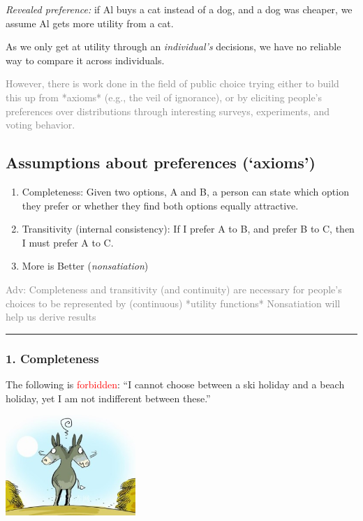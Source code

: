\documentclass[]{article}
\begin{document}
\emph{Revealed preference:} if Al buys a cat instead of a dog, and a dog was cheaper, we assume Al gets more utility from a cat.

As we only get at utility through an \emph{individual's} decisions, we have no reliable way to compare it across individuals.

\textcolor{gray}{However, there is work done in the field of public choice trying either to build this up from *axioms* (e.g., the veil of ignorance),
or by eliciting people's preferences over distributions through interesting surveys, experiments, and voting behavior.}

\hypertarget{assumptions-about-preferences-axioms}{%
\subsection{Assumptions about preferences (`axioms')}\label{assumptions-about-preferences-axioms}}

\begin{enumerate}
\def\labelenumi{\arabic{enumi}.}
\item
  Completeness: Given two options, A and B, a person can state which option they prefer or whether they find both options equally attractive.
\item
  Transitivity (internal consistency): If I prefer A to B, and prefer B to C, then I must prefer A to C.
\item
  More is Better (\emph{nonsatiation})
\end{enumerate}

\textcolor{gray}{Adv: Completeness and transitivity (and continuity)  are necessary for people's choices to be represented by (continuous) *utility functions*
Nonsatiation will help us derive results}

\begin{center}\rule{0.5\linewidth}{\linethickness}\end{center}

\hypertarget{completeness}{%
\subsubsection{1. Completeness}\label{completeness}}

The following is \textcolor{red}{forbidden}: ``I cannot choose between a ski holiday and a beach holiday, yet I am not indifferent between these.''

\includegraphics[height=1.5in]{picsfigs/donkeybales.jpeg}
\end{document}
